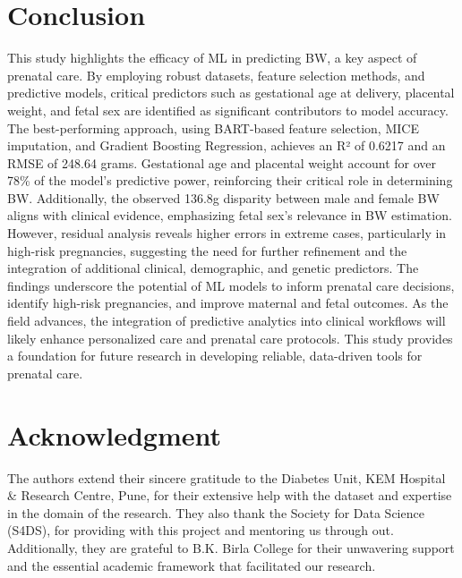 \documentclass[12pt]{article}
\begin{document}
\section{Conclusion}
This study highlights the efficacy of ML in predicting BW, a key aspect of prenatal care. By employing robust datasets, feature selection methods, and predictive models, critical predictors such as gestational age at delivery, placental weight, and fetal sex are identified as significant contributors to model accuracy. The best-performing approach, using BART-based feature selection, MICE imputation, and Gradient Boosting Regression, achieves an R² of 0.6217 and an RMSE of 248.64 grams.
Gestational age and placental weight account for over 78\% of the model's predictive power, reinforcing their critical role in determining BW. Additionally, the observed 136.8g disparity between male and female BW aligns with clinical evidence, emphasizing fetal sex's relevance in BW estimation. However, residual analysis reveals higher errors in extreme cases, particularly in high-risk pregnancies, suggesting the need for further refinement and the integration of additional clinical, demographic, and genetic predictors.
The findings underscore the potential of ML models to inform prenatal care decisions, identify high-risk pregnancies, and improve maternal and fetal outcomes. As the field advances, the integration of predictive analytics into clinical workflows will likely enhance personalized care and prenatal care protocols. This study provides a foundation for future research in developing reliable, data-driven tools for prenatal care.

\section{Acknowledgment}
The authors extend their sincere gratitude to the Diabetes Unit, KEM Hospital \& Research Centre, Pune, for their extensive help with the dataset and expertise in the domain of the research. They also thank the Society for Data Science (S4DS), for providing with this project and mentoring us through out. Additionally, they are grateful to B.K. Birla College for their unwavering support and the essential academic framework that facilitated our research.

\end{document}
